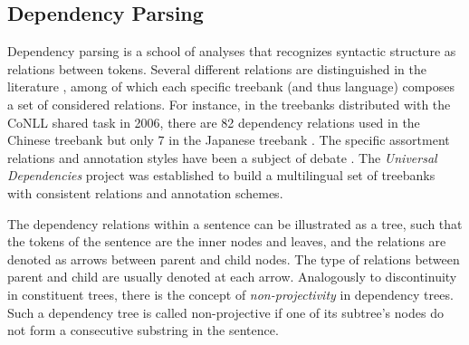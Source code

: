 \documentclass[../document.tex]{subfiles}
\begin{document}
    \subsection{Dependency Parsing}
    Dependency parsing is a school of analyses that recognizes syntactic structure as relations between tokens.
    Several different relations are distinguished in the literature \citep[Table~3 shows the list of dependency relations annotated in the Universal Dependencies treebanks]{de2021universal}, among of which each specific treebank (and thus language) composes a set of considered relations.
    For instance, in the treebanks distributed with the CoNLL shared task in 2006, there are 82 dependency relations used in the Chinese treebank but only 7 in the Japanese treebank \citep[Table~1]{buchholz2006conll}.
    The specific assortment relations and annotation styles have been a subject of debate \citep{Gerdes2016DependencyAC,Rehbein2017UniversalDA,osborne2019status}.
    The \emph{Universal Dependencies} project \citep{de2021universal} was established to build a multilingual set of treebanks with consistent relations and annotation schemes.

    The dependency relations within a sentence can be illustrated as a tree, such that the tokens of the sentence are the inner nodes and leaves, and the relations are denoted as arrows between parent and child nodes.
    The type of relations between parent and child are usually denoted at each arrow.
    Analogously to discontinuity in constituent trees, there is the concept of \emph{non-projectivity} in dependency trees.
    Such a dependency tree is called non-projective if one of its subtree's nodes do not form a consecutive substring in the sentence.
\end{document}
